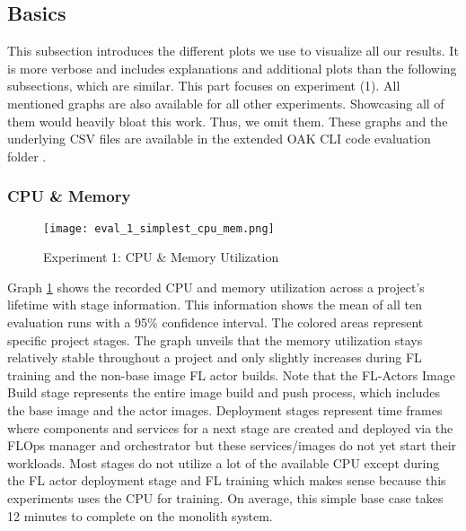 \subsection{Basics}

This subsection introduces the different plots we use to visualize all our results.
It is more verbose and includes explanations and additional plots than the following subsections, which are similar.
This part focuses on experiment (1).
All mentioned graphs are also available for all other experiments.
Showcasing all of them would heavily bloat this work.
Thus, we omit them.
These graphs and the underlying CSV files are available in the extended OAK CLI code evaluation folder \cite{cli_code}.

\subsubsection{CPU \& Memory}

\begin{figure}[h]
    \begin{adjustwidth}{-0.2\paperwidth}{-0.2\paperwidth}
        \centering
        \texttt{[image: eval\_1\_simplest\_cpu\_mem.png]}
        \caption{Experiment 1: CPU \& Memory Utilization}
        \label{fig:eval_1_simplest_cpu_mem}
    \end{adjustwidth}
\end{figure}

Graph \ref{fig:eval_1_simplest_cpu_mem} shows the recorded CPU and memory utilization across a project's lifetime with stage information.
This information shows the mean of all ten evaluation runs with a 95\% confidence interval.
The colored areas represent specific project stages.
The graph unveils that the memory utilization stays relatively stable throughout a project and only slightly increases during FL training and the non-base image FL actor builds.
Note that the FL-Actors Image Build stage represents the entire image build and push process, which includes the base image and the actor images.
Deployment stages represent time frames where components and services for a next stage are created and deployed via the FLOps manager and orchestrator but these services/images do not yet start their workloads.
Most stages do not utilize a lot of the available CPU except during the FL actor deployment stage and FL training which makes sense because this experiments uses the CPU for training.
On average, this simple base case takes 12 minutes to complete on the monolith system.

